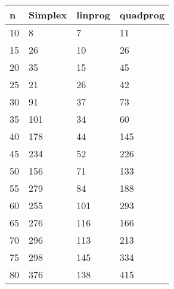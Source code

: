 \begin{tabular}{llll}
n & Simplex & linprog & quadprog \\ 
\hline 
10 & 8 & 7 & 11 \\ 
15 & 26 & 10 & 26 \\ 
20 & 35 & 15 & 45 \\ 
25 & 21 & 26 & 42 \\ 
30 & 91 & 37 & 73 \\ 
35 & 101 & 34 & 60 \\ 
40 & 178 & 44 & 145 \\ 
45 & 234 & 52 & 226 \\ 
50 & 156 & 71 & 133 \\ 
55 & 279 & 84 & 188 \\ 
60 & 255 & 101 & 293 \\ 
65 & 276 & 116 & 166 \\ 
70 & 296 & 113 & 213 \\ 
75 & 298 & 145 & 334 \\ 
80 & 376 & 138 & 415 \\ 
\hline 
\end{tabular}